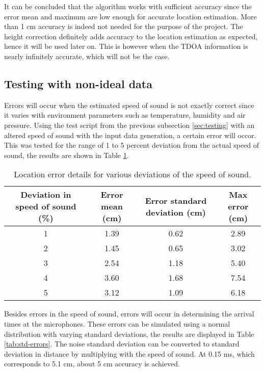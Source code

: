 \documentclass[final]{scrreprt} %
\begin{document}
It can be concluded that the algorithm works with sufficient accuracy since the error mean and maximum are low enough for accurate location estimation.
More than 1 cm accuracy is indeed not needed for the purpose of the project.
The height correction definitely adds accuracy to the location estimation as expected, hence it will be used later on.
This is however when the TDOA information is nearly infinitely accurate, which will not be the case.

\subsection{Testing with non-ideal data}
Errors will occur when the estimated speed of sound is not exactly correct since it varies with environment parameters such as temperature, humidity and air pressure.
Using the test script from the previous subsection \ref{sec:testing} with an altered speed of sound with the input data generation, a certain error will occor.
This was tested for the range of 1 to 5 percent deviation from the actual speed of sound, the results are shown in Table \ref{tab:c-errors}.

\begin{table} [H]
\centering
	\begin{tabular}{ c | c | c | c }
  	Deviation in speed of sound (\%) & Error mean (cm) & Error standard deviation (cm) & Max error (cm) \\ \hline
  	1 & 1.39 & 0.62 & 2.89 \\
	2 & 1.45 & 0.65 & 3.02 \\
	3 & 2.54 & 1.18 & 5.40 \\
	4 & 3.60 & 1.68 & 7.54 \\
  	5 & 3.12 & 1.09 & 6.18 \\
	\end{tabular}
\caption{Location error details for various deviations of the speed of sound.}
\label{tab:c-errors}
\end{table}

Besides errors in the speed of sound, errors will occur in determining the arrival times at the microphones.
These errors can be simulated using a normal distribution with varying standard deviations, the results are displayed in Table \ref{tab:std-errors}.
The noise standard deviation can be converted to standard deviation in distance by multiplying with the speed of sound.
At 0.15 ms, which corresponds to 5.1 cm, about 5 cm accuracy is achieved.
\end{document}
